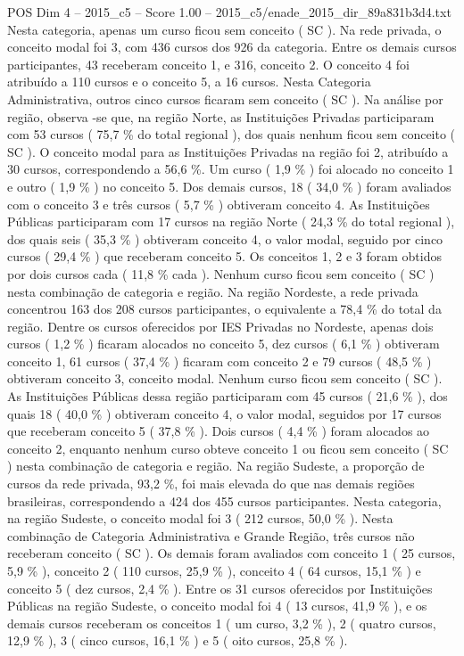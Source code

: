 \begin{textsample}{POS Dim 4 – 2015\_c5 – Score 1.00 – 2015\_c5/enade\_2015\_dir\_89a831b3d4.txt}
Nesta categoria, apenas um curso ficou sem conceito ( SC ).
Na rede privada, o conceito modal foi 3, com 436 cursos dos 926 da categoria.
Entre os demais cursos participantes, 43 receberam conceito 1, e 316, conceito 2.
O conceito 4 foi atribuído a 110 cursos e o conceito 5, a 16 cursos.
Nesta Categoria Administrativa, outros cinco cursos ficaram sem conceito ( SC ).
Na análise por região, observa -se que, na região Norte, as Instituições Privadas participaram com 53 cursos ( 75,7 \% do total regional ), dos quais nenhum ficou sem conceito ( SC ).
O conceito modal para as Instituições Privadas na região foi 2, atribuído a 30 cursos, correspondendo a 56,6 \%.
Um curso ( 1,9 \% ) foi alocado no conceito 1 e outro ( 1,9 \% ) no conceito 5.
Dos demais cursos, 18 ( 34,0 \% ) foram avaliados com o conceito 3 e três cursos ( 5,7 \% ) obtiveram conceito 4.
As Instituições Públicas participaram com 17 cursos na região Norte ( 24,3 \% do total regional ), dos quais seis ( 35,3 \% ) obtiveram conceito 4, o valor modal, seguido por cinco cursos ( 29,4 \% ) que receberam conceito 5.
Os conceitos 1, 2 e 3 foram obtidos por dois cursos cada ( 11,8 \% cada ).
Nenhum curso ficou sem conceito ( SC ) nesta combinação de categoria e região.
Na região Nordeste, a rede privada concentrou 163 dos 208 cursos participantes, o equivalente a 78,4 \% do total da região.
Dentre os cursos oferecidos por IES Privadas no Nordeste, apenas dois cursos ( 1,2 \% ) ficaram alocados no conceito 5, dez cursos ( 6,1 \% ) obtiveram conceito 1, 61 cursos ( 37,4 \% ) ficaram com conceito 2 e 79 cursos ( 48,5 \% ) obtiveram conceito 3, conceito modal.
Nenhum curso ficou sem conceito ( SC ).
As Instituições Públicas dessa região participaram com 45 cursos ( 21,6 \% ), dos quais 18 ( 40,0 \% ) obtiveram conceito 4, o valor modal, seguidos por 17 cursos que receberam conceito 5 ( 37,8 \% ).
Dois cursos ( 4,4 \% ) foram alocados ao conceito 2, enquanto nenhum curso obteve conceito 1 ou ficou sem conceito ( SC ) nesta combinação de categoria e região.
Na região Sudeste, a proporção de cursos da rede privada, 93,2 \%, foi mais elevada do que nas demais regiões brasileiras, correspondendo a 424 dos 455 cursos participantes.
Nesta categoria, na região Sudeste, o conceito modal foi 3 ( 212 cursos, 50,0 \% ).
Nesta combinação de Categoria Administrativa e Grande Região, três cursos não receberam conceito ( SC ).
Os demais foram avaliados com conceito 1 ( 25 cursos, 5,9 \% ), conceito 2 ( 110 cursos, 25,9 \% ), conceito 4 ( 64 cursos, 15,1 \% ) e conceito 5 ( dez cursos, 2,4 \% ).
Entre os 31 cursos oferecidos por Instituições Públicas na região Sudeste, o conceito modal foi 4 ( 13 cursos, 41,9 \% ), e os demais cursos receberam os conceitos 1 ( um curso, 3,2 \% ), 2 ( quatro cursos, 12,9 \% ), 3 ( cinco cursos, 16,1 \% ) e 5 ( oito cursos, 25,8 \% ).

\end{textsample}
